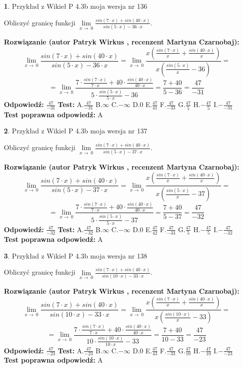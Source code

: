 \documentclass[12pt, a4paper]{article}
\theoremstyle{definition} %
\newtheorem{zad}{}
\newcommand{\zadStart}[1]{\begin{zad}#1\newline}
\newcommand{\zadStop}{\end{zad}}
\newcommand{\rozwStart}[2]{\noindent \textbf{Rozwiązanie (autor #1 , recenzent #2): }\newline}
\newcommand{\rozwStop}{\newline}
\newcommand{\odpStart}{\noindent \textbf{Odpowiedź:}\newline}
\newcommand{\odpStop}{\newline}
\newcommand{\testStart}{\noindent \textbf{Test:}\newline}
\newcommand{\testStop}{\newline}
\newcommand{\kluczStart}{\noindent \textbf{Test poprawna odpowiedź:}\newline}
\newcommand{\kluczStop}{\newline}
\begin{document}
\zadStart{Przykład z Wikieł P 4.3b moja wersja nr 136}


Obliczyć granicę funkcji $\lim\limits_{x\to\ 0}\frac{sin(7 \cdot x)+sin(40 \cdot x)}{sin(5 \cdot x)-36 \cdot x}$.
\zadStop
\rozwStart{Patryk Wirkus}{Martyna Czarnobaj}
$$\lim\limits_{x\to\ 0}\frac{sin(7 \cdot x)+sin(40 \cdot x)}{sin(5 \cdot x)-36 \cdot x}=\lim\limits_{x\to\ 0}\frac{x(\frac{sin(7 \cdot x)}{x}+\frac{sin(40 \cdot x)}{x})}{x(\frac{sin(5 \cdot x)}{x}-36)}=$$
$$=\lim\limits_{x\to\ 0}\frac{7 \cdot \frac{sin(7 \cdot x)}{7 \cdot x}+40 \cdot \frac{sin(40 \cdot x)}{40 \cdot x}}{5 \cdot \frac{sin(5 \cdot x)}{5 \cdot x}-36}=\frac{7+40}{5-36} = \frac{47}{-31}$$
\rozwStop
\odpStart
$\frac{47}{-31}$
\odpStop
\testStart
A.$\frac{47}{-31}$
B.$\infty$
C.$-\infty$
D.$0$
E.$\frac{47}{41}$
F.$\frac{47}{-33}$
G.$\frac{47}{5}$
H.$-\frac{47}{5}$
I.$-\frac{47}{-31}$
\testStop
\kluczStart
A
\kluczStop



\zadStart{Przykład z Wikieł P 4.3b moja wersja nr 137}


Obliczyć granicę funkcji $\lim\limits_{x\to\ 0}\frac{sin(7 \cdot x)+sin(40 \cdot x)}{sin(5 \cdot x)-37 \cdot x}$.
\zadStop
\rozwStart{Patryk Wirkus}{Martyna Czarnobaj}
$$\lim\limits_{x\to\ 0}\frac{sin(7 \cdot x)+sin(40 \cdot x)}{sin(5 \cdot x)-37 \cdot x}=\lim\limits_{x\to\ 0}\frac{x(\frac{sin(7 \cdot x)}{x}+\frac{sin(40 \cdot x)}{x})}{x(\frac{sin(5 \cdot x)}{x}-37)}=$$
$$=\lim\limits_{x\to\ 0}\frac{7 \cdot \frac{sin(7 \cdot x)}{7 \cdot x}+40 \cdot \frac{sin(40 \cdot x)}{40 \cdot x}}{5 \cdot \frac{sin(5 \cdot x)}{5 \cdot x}-37}=\frac{7+40}{5-37} = \frac{47}{-32}$$
\rozwStop
\odpStart
$\frac{47}{-32}$
\odpStop
\testStart
A.$\frac{47}{-32}$
B.$\infty$
C.$-\infty$
D.$0$
E.$\frac{47}{42}$
F.$\frac{47}{-33}$
G.$\frac{47}{5}$
H.$-\frac{47}{5}$
I.$-\frac{47}{-32}$
\testStop
\kluczStart
A
\kluczStop



\zadStart{Przykład z Wikieł P 4.3b moja wersja nr 138}


Obliczyć granicę funkcji $\lim\limits_{x\to\ 0}\frac{sin(7 \cdot x)+sin(40 \cdot x)}{sin(10 \cdot x)-33 \cdot x}$.
\zadStop
\rozwStart{Patryk Wirkus}{Martyna Czarnobaj}
$$\lim\limits_{x\to\ 0}\frac{sin(7 \cdot x)+sin(40 \cdot x)}{sin(10 \cdot x)-33 \cdot x}=\lim\limits_{x\to\ 0}\frac{x(\frac{sin(7 \cdot x)}{x}+\frac{sin(40 \cdot x)}{x})}{x(\frac{sin(10 \cdot x)}{x}-33)}=$$
$$=\lim\limits_{x\to\ 0}\frac{7 \cdot \frac{sin(7 \cdot x)}{7 \cdot x}+40 \cdot \frac{sin(40 \cdot x)}{40 \cdot x}}{10 \cdot \frac{sin(10 \cdot x)}{10 \cdot x}-33}=\frac{7+40}{10-33} = \frac{47}{-23}$$
\rozwStop
\odpStart
$\frac{47}{-23}$
\odpStop
\testStart
A.$\frac{47}{-23}$
B.$\infty$
C.$-\infty$
D.$0$
E.$\frac{47}{43}$
F.$\frac{47}{-33}$
G.$\frac{47}{10}$
H.$-\frac{47}{10}$
I.$-\frac{47}{-23}$
\testStop
\kluczStart
A
\kluczStop
\end{document}
